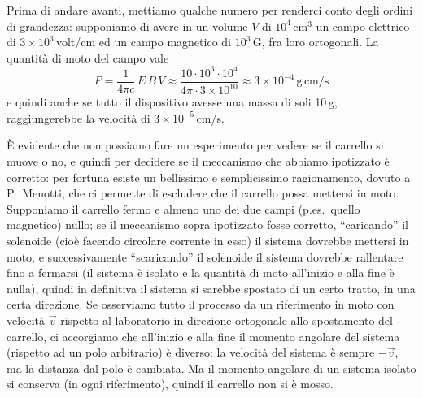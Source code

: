 Prima di andare avanti, mettiamo qualche numero per renderci conto degli ordini
di
grandezza: supponiamo di avere in un volume $V$ di $10^4$\,cm$^3$ un campo
elettrico di $3\times10^3$\,volt/cm ed un campo magnetico di $10^3$\,G, fra loro
ortogonali. La quantit\`a di moto del campo vale
\begin{equation}
  P=\frac{1}{4\pi c}\,E\,B\,V
  \approx\frac{10\cdot10^3\cdot10^4}{4\pi\cdot3\times10^{10}}
  \approx3\times10^{-4}\,\mathrm{g\,cm/s}
  \tag{11.40}
\end{equation}
e quindi anche se tutto il dispositivo avesse una massa di soli 10\,g,
raggiungerebbe la velocit\`a di $3\times10^{-5}$\,cm/s.

\`E evidente che non possiamo fare un esperimento per vedere se il carrello si
muove o no, e quindi per decidere se il meccanismo che abbiamo ipotizzato \`e
corretto: per fortuna esiste un bellissimo e semplicissimo ragionamento, dovuto
a P.~Menotti, che ci permette di escludere che il carrello possa mettersi in
moto. Supponiamo il carrello fermo e almeno uno dei due campi (p.es.\ quello
magnetico) nullo; se il meccanismo sopra ipotizzato fosse corretto,
``caricando'' il solenoide (cio\`e facendo circolare corrente in esso) il
sistema dovrebbe mettersi in moto, e successivamente ``scaricando'' il solenoide
il sistema dovrebbe rallentare fino a fermarsi (il sistema \`e isolato e la
quantit\`a di moto all'inizio e alla fine \`e nulla), quindi in definitiva il
sistema si sarebbe spostato di un certo tratto, in una certa direzione. Se
osserviamo tutto il processo da un riferimento in moto con velocit\`a $\vec v$
rispetto al laboratorio in direzione ortogonale allo spostamento del carrello,
ci accorgiamo che all'inizio e alla fine il momento angolare del sistema
(rispetto ad un polo arbitrario) \`e diverso: la velocit\`a del sistema \`e
sempre $-\vec v$, ma la distanza dal polo \`e cambiata. Ma il momento angolare
di un sistema isolato si conserva (in ogni riferimento), quindi il carrello non
si \`e mosso.

